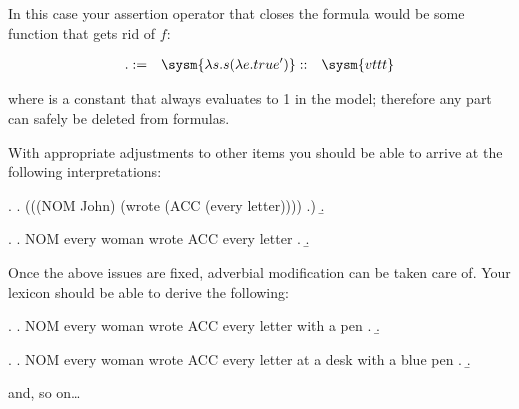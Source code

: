 \documentclass[10pt,a4paper]{exam}
\begin{document}
\begin{questions}
In this case your assertion operator that closes the formula would be some function that gets rid of $f$:


\[
\begin{align*}
	\text{.}   &:=& \sysm{\lambda s . s (\lambda e . true')
}  &::& \sysm{vttt}
\end{align*}
\]


where  is a constant that always evaluates to 1 in the model; therefore any part  can safely be deleted from formulas.

With appropriate adjustments to other items you should be able to
arrive at the following interpretations:


\ex.
\a. (((NOM John) (wrote (ACC (every letter)))) .)
\b. 


\ex.
\a.  NOM every woman wrote ACC every letter .
\b. 


\question[20]

Once the above issues are fixed, adverbial modification can be taken care of. Your lexicon should be able to derive the following:

\ex.
\a. NOM every woman wrote ACC every letter with a pen .
\b. 


\ex.
\a. NOM every woman wrote ACC every letter at a desk with a blue pen .
\b. 


and, so on\ldots

\end{questions}
\end{document}

